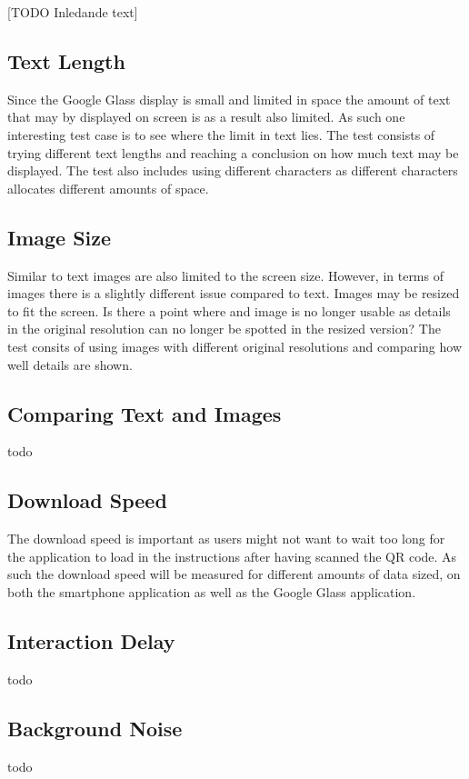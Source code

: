 [TODO Inledande text]

\subsection{Text Length}
Since the Google Glass display is small and limited in space the amount of text that may by displayed on screen is as a result also limited. As such one interesting test case is to see where the limit in text lies. The test consists of trying different text lengths and reaching a conclusion on how much text may be displayed. The test also includes using different characters as different characters allocates different amounts of space.

\subsection{Image Size}
Similar to text images are also limited to the screen size. However, in terms of images there is a slightly different issue compared to text. Images may be resized to fit the screen. Is there a point where and image is no longer usable as details in the original resolution can no longer be spotted in the resized version? The test consits of using images with different original resolutions and comparing how well details are shown.

\subsection{Comparing Text and Images}
todo

\subsection{Download Speed}
The download speed is important as users might not want to wait too long for the application to load in the instructions after having scanned the QR code. As such the download speed will be measured for different amounts of data sized, on both the smartphone application as well as the Google Glass application. 

\subsection{Interaction Delay}
todo

\subsection{Background Noise}
todo

